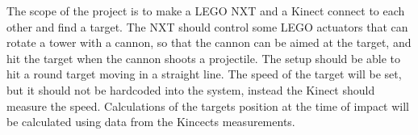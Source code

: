 The scope of the project is to make a LEGO NXT and a Kinect connect to each other and find a target. The NXT should control some LEGO actuators that can rotate a tower with a cannon, so that the cannon can be aimed at the target, and hit the target when the cannon shoots a projectile. The setup should be able to hit a round target moving in a straight line. The speed of the target will be set, but it should not be hardcoded into the system, instead the Kinect should measure the speed. Calculations of the targets position at the time of impact will be calculated using data from the Kincects measurements.